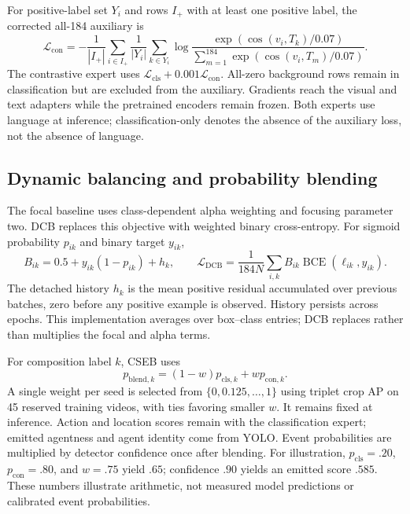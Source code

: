 \documentclass[11pt,letterpaper]{article}
\begin{document}
For positive-label set $Y_i$ and rows $I_+$ with at least one positive label, the corrected all-184 auxiliary is
\begin{equation}
\mathcal L_{\mathrm{con}}=-\frac{1}{|I_+|}\sum_{i\in I_+}\frac{1}{|Y_i|}\sum_{k\in Y_i}
\log\frac{\exp(\cos(v_i,T_k)/0.07)}{\sum_{m=1}^{184}\exp(\cos(v_i,T_m)/0.07)}.
\end{equation}
The contrastive expert uses $\mathcal L_{\mathrm{cls}}+0.001\mathcal L_{\mathrm{con}}$. All-zero background rows remain in classification but are excluded from the auxiliary. Gradients reach the visual and text adapters while the pretrained encoders remain frozen. Both experts use language at inference; classification-only denotes the absence of the auxiliary loss, not the absence of language.

\subsection{Dynamic balancing and probability blending}
The focal baseline uses class-dependent alpha weighting and focusing parameter two. DCB replaces this objective with weighted binary cross-entropy. For sigmoid probability $p_{ik}$ and binary target $y_{ik}$,
\begin{equation}
B_{ik}=0.5+y_{ik}(1-p_{ik})+h_k,\qquad
\mathcal L_{\mathrm{DCB}}=\frac{1}{184N}\sum_{i,k}B_{ik}\operatorname{BCE}(\ell_{ik},y_{ik}).
\end{equation}
The detached history $h_k$ is the mean positive residual accumulated over previous batches, zero before any positive example is observed. History persists across epochs. This implementation averages over box--class entries; DCB replaces rather than multiplies the focal and alpha terms.

For composition label $k$, CSEB uses
\begin{equation}
p_{\mathrm{blend},k}=(1-w)p_{\mathrm{cls},k}+wp_{\mathrm{con},k}.
\end{equation}
A single weight per seed is selected from $\{0,0.125,\ldots,1\}$ using triplet crop AP on 45 reserved training videos, with ties favoring smaller $w$. It remains fixed at inference. Action and location scores remain with the classification expert; emitted agentness and agent identity come from YOLO. Event probabilities are multiplied by detector confidence once after blending. For illustration, $p_{\mathrm{cls}}=.20$, $p_{\mathrm{con}}=.80$, and $w=.75$ yield $.65$; confidence $.90$ yields an emitted score $.585$. These numbers illustrate arithmetic, not measured model predictions or calibrated event probabilities.
\end{document}
